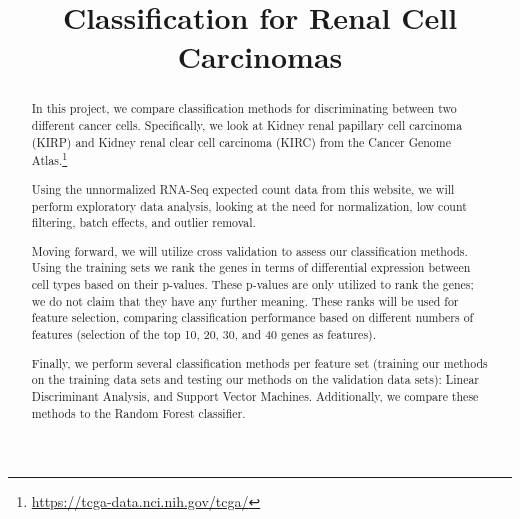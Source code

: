 



\begin{frontmatter}

\title{Classification for Renal Cell Carcinomas}



\begin{abstract}

In this project, we compare classification methods for discriminating between
two different cancer cells. Specifically, we look at Kidney renal
papillary cell carcinoma (KIRP) and Kidney renal clear cell carcinoma (KIRC)
from the Cancer Genome Atlas.\footnote{\url{https://tcga-data.nci.nih.gov/tcga/}}

Using the unnormalized RNA-Seq expected count data from this website, we will
perform exploratory data analysis, looking at the need for normalization, low
count filtering, batch effects, and outlier removal.

Moving forward, we will utilize cross validation to assess our
classification methods. Using the training sets we rank the genes in terms
of differential expression between cell types based on their p-values.  These p-values 
are only utilized to rank the genes; we do not claim that they have any further meaning.
These ranks will be used for feature selection, comparing classification performance
based on different numbers of features (selection of the top 10, 20, 30, and 40
genes as features).

Finally, we perform several classification methods per feature set
(training our methods on the training data sets and testing our methods on the
validation data sets): Linear Discriminant Analysis, and
Support Vector Machines.  Additionally, we compare these methods to the
Random Forest classifier.

 
\end{abstract}

\begin{keyword}
\end{keyword}

\end{frontmatter}



